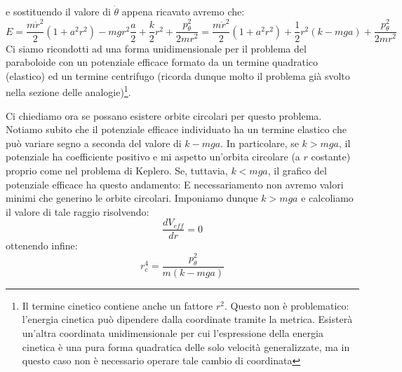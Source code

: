 \documentclass[a4paper,openany]{article}
\begin{document}
	e sostituendo il valore di $\dot{\theta}$ appena ricavato avremo che:
	$$
	E = \dfrac{m\dot{r}^{2}}{2}(1+a^{2}r^{2})- mgr^{2}\dfrac{a}{2} +  \dfrac{k}{2}r^{2} + \dfrac{p_{\theta}^{2}}{2mr^{2}} = \dfrac{m\dot{r}^{2}}{2}(1+a^{2}r^{2})+ \dfrac{1}{2}r^{2}( k-mga) + \dfrac{p_{\theta}^{2}}{2mr^{2}}
	$$
	Ci siamo ricondotti ad una forma unidimensionale per il problema del paraboloide con un potenziale efficace formato da un termine quadratico (elastico) ed un termine centrifugo (ricorda dunque molto il problema già svolto nella sezione delle analogie)\footnote{Il termine cinetico contiene anche un fattore $r^2$. Questo non è problematico: l'energia cinetica può dipendere dalla coordinate tramite la metrica. Esisterà un'altra coordinata unidimensionale per cui l'espressione della energia cinetica è una pura forma quadratica delle solo velocità generalizzate, ma in questo caso non è necessario operare tale cambio di coordinata}.
	
	Ci chiediamo ora se possano esistere orbite circolari per questo problema. Notiamo subito che il potenziale efficace individuato ha un termine elastico che può variare segno a seconda del valore di $k-mga$. In particolare, se $k> mga$, il potenziale ha coefficiente positivo e mi aspetto un'orbita circolare (a $r$ costante) proprio come nel problema di Keplero. Se, tuttavia, $k<mga$, il grafico del potenziale efficace ha questo andamento:
	E necessariamento non avremo valori minimi che generino le orbite circolari. Imponiamo dunque $k>mga$ e calcoliamo il valore di tale raggio risolvendo:
	$$
	\dfrac{dV_{eff}}{dr} = 0
	$$
	ottenendo infine:
	$$
	r^{4}_{c} = \dfrac{p_{\theta}^{2}}{m(k-mga)}
	$$
	\newpage
\end{document}
